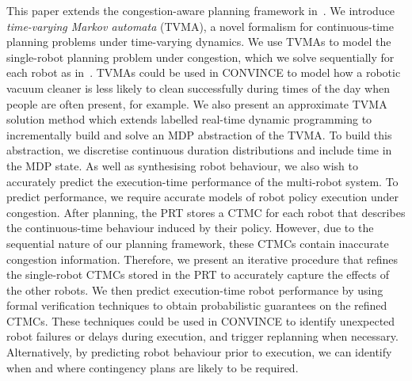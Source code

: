 \documentclass[12pt]{article}
\begin{document}
\begin{enumerate}
This paper extends the congestion-aware planning framework in~\cite{street2020multi}.
%
We introduce \emph{time-varying Markov automata} (TVMA), a novel formalism for continuous-time planning problems under time-varying dynamics.
%
We use TVMAs to model the single-robot planning problem under congestion, which we solve sequentially for each robot as in~\cite{street2020multi}.
%
TVMAs could be used in CONVINCE to model how a robotic vacuum cleaner is less likely to clean successfully during times of the day when people are often present, for example.
% 
We also present an approximate TVMA solution method which extends labelled real-time dynamic programming to incrementally build and solve an MDP abstraction of the TVMA.
%
To build this abstraction, we discretise continuous duration distributions and include time in the MDP state.
%
As well as synthesising robot behaviour, we also wish to accurately predict the execution-time performance of the multi-robot system.
%
To predict performance, we require accurate models of robot policy
execution under congestion.
%
After planning, the PRT stores a CTMC for each robot that describes the continuous-time behaviour induced by their policy.
%
However, due to the sequential nature of our planning framework, these CTMCs contain inaccurate congestion information.
%
Therefore, we present an iterative procedure that refines the single-robot CTMCs stored in the PRT to accurately capture the effects of the other robots. 
%
We then predict execution-time robot performance by using formal verification techniques to obtain probabilistic guarantees on the refined CTMCs.
%
These techniques could be used in CONVINCE to identify unexpected robot failures or delays during execution, and trigger replanning when necessary.
%
Alternatively, by predicting robot behaviour prior to execution, we can identify when and where contingency plans are likely to be required.


\end{enumerate}
\end{document}
